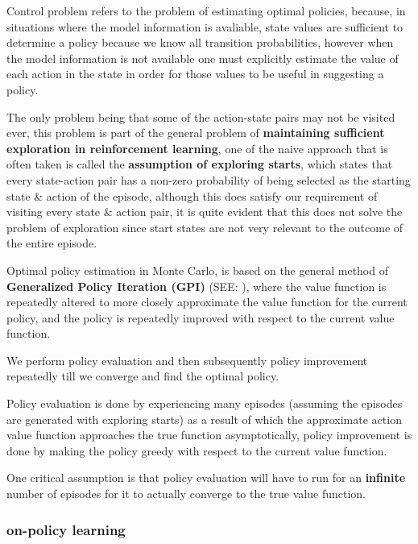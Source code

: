 Control problem refers to the problem of estimating optimal policies, because, in situations where the model information is avaliable, state values are sufficient to determine a policy because we know all transition probabilities, however when the model information is not available one must explicitly estimate the value of each action in the state in order for those values to be useful in suggesting a policy.

The only problem being that some of the action-state pairs may not be visited ever, this problem is part of the general problem of \textbf{maintaining sufficient exploration in reinforcement learning}, one of the naive approach that is often taken is called the \textbf{assumption of exploring starts}, which states that every state-action pair has a non-zero probability of being selected as the starting state \& action of the episode, although this does satisfy our requirement of visiting every state \& action pair, it is quite evident that this does not solve the problem of exploration since start states are not very relevant to the outcome of the entire episode.

Optimal policy estimation in Monte Carlo, is based on the general method of \textbf{Generalized Policy Iteration (GPI)} (SEE: ), where the value function is repeatedly altered to more closely approximate the value function for the current policy, and the policy is repeatedly improved with respect to the current value function.

We perform policy evaluation and then subsequently policy improvement repeatedly till we converge and find the optimal policy.

Policy evaluation is done by experiencing many episodes (assuming the episodes are generated with exploring starts) as a result of which the approximate action value function approaches the true function asymptotically, policy improvement is done by making the policy greedy with respect to the current value function.

One critical assumption is that policy evaluation will have to run for an \textbf{infinite} number of episodes for it to actually converge to the true value function.

\subsubsection{on-policy learning \cite{medium/nerd-for-tech/monte-carlo-methods-for-reinforcement-learning-d30d874dd817}}\label{RL: on-policy learning}

